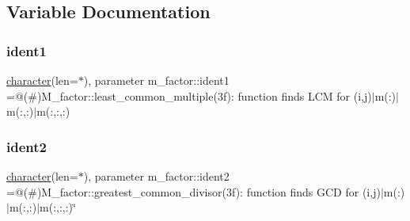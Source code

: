 \subsection{Variable Documentation}
\mbox{\label{namespacem__factor_a7ae228777d43741d83e3a4df917f39df}} 
\subsubsection{\texorpdfstring{ident1}{ident1}}
{\footnotesize\ttfamily \hyperlink{option__stopwatch_83_8txt_abd4b21fbbd175834027b5224bfe97e66}{character}(len=$\ast$), parameter m\+\_\+factor\+::ident1 =\textquotesingle{}@(\#)M\+\_\+factor\+::least\+\_\+common\+\_\+multiple(3f)\+: function finds L\+C\+M for (i,j)$\vert$m(\+:)$\vert$m(\+:,\+:)$\vert$m(\+:,\+:,\+:)\textquotesingle{}\hspace{0.3cm}{\ttfamily [private]}}

\mbox{\label{namespacem__factor_ab34da44c20883bea1b31a67a3d6359e5}} 
\subsubsection{\texorpdfstring{ident2}{ident2}}
{\footnotesize\ttfamily \hyperlink{option__stopwatch_83_8txt_abd4b21fbbd175834027b5224bfe97e66}{character}(len=$\ast$), parameter m\+\_\+factor\+::ident2 =\textquotesingle{}@(\#)M\+\_\+factor\+::greatest\+\_\+common\+\_\+divisor(3f)\+: function finds G\+C\+D for (i,j)$\vert$m(\+:)$\vert$m(\+:,\+:)$\vert$m(\+:,\+:,\+:)\char`\"{}\textquotesingle{}\hspace{0.3cm}{\ttfamily [private]}}

